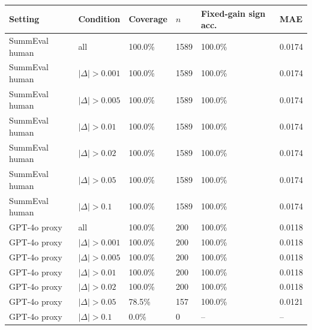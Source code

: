 \begin{tabular}{llllll}
\toprule
Setting & Condition & Coverage & $n$ & Fixed-gain sign acc. & MAE \\
\midrule
SummEval human & all & 100.0\% & 1589 & 100.0\% & 0.0174 \\
SummEval human & $|\Delta|>0.001$ & 100.0\% & 1589 & 100.0\% & 0.0174 \\
SummEval human & $|\Delta|>0.005$ & 100.0\% & 1589 & 100.0\% & 0.0174 \\
SummEval human & $|\Delta|>0.01$ & 100.0\% & 1589 & 100.0\% & 0.0174 \\
SummEval human & $|\Delta|>0.02$ & 100.0\% & 1589 & 100.0\% & 0.0174 \\
SummEval human & $|\Delta|>0.05$ & 100.0\% & 1589 & 100.0\% & 0.0174 \\
SummEval human & $|\Delta|>0.1$ & 100.0\% & 1589 & 100.0\% & 0.0174 \\
GPT-4o proxy & all & 100.0\% & 200 & 100.0\% & 0.0118 \\
GPT-4o proxy & $|\Delta|>0.001$ & 100.0\% & 200 & 100.0\% & 0.0118 \\
GPT-4o proxy & $|\Delta|>0.005$ & 100.0\% & 200 & 100.0\% & 0.0118 \\
GPT-4o proxy & $|\Delta|>0.01$ & 100.0\% & 200 & 100.0\% & 0.0118 \\
GPT-4o proxy & $|\Delta|>0.02$ & 100.0\% & 200 & 100.0\% & 0.0118 \\
GPT-4o proxy & $|\Delta|>0.05$ & 78.5\% & 157 & 100.0\% & 0.0121 \\
GPT-4o proxy & $|\Delta|>0.1$ & 0.0\% & 0 & -- & -- \\
\bottomrule
\end{tabular}

